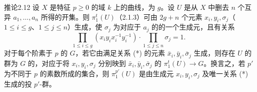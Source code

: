 \begin{SGAresult}{推论}{2.12}
设 $X$ 是特征 $p\geqslant0$ 的域 $k$ 上的曲线，为 $g$。设 $U$ 是从 $X$ 中删去 $n$ 个互异 $a_1,\dots,a_n$ 所得的开集。则 $\pi_1^t(U)$（2.1.3）可由 $2g+n$ 个元素 $x_i,y_i,\sigma_j$（$1\leqslant i\leqslant g$、$1\leqslant j\leqslant n$）生成，使 $\sigma_j$ 为对应于 $a_j$ 的的一个生成元，且有关系
\[\prod_{1\leqslant i\leqslant g}(x_iy_ix_i^{-1}y_i^{-1})\cdot\prod_{1\leqslant j\leqslant n}\sigma_j=1.\tag{*}\]
对于每个阶素于 $p$ 的 $G$，若它由满足关系 (*) 的元素 $\bar x_i,\bar y_i,\bar\sigma_j$ 生成，则存在 $U$ 的群为 $G$ 的，对应于将 $x_i,y_i,\sigma_j$ 分别映到 $\bar x_i,\bar y_i,\bar\sigma_j$ 的 $\pi_1^t(U)\to G$。换言之，若 $p'$ 为不同于 $p$ 的素数所成的集合，则 $\pi_1^{p'}(U)$ 是由生成元 $x_i,y_i,\sigma_j$ 及唯一关系 (*) 生成的投 $p'$-群。
\end{SGAresult}
